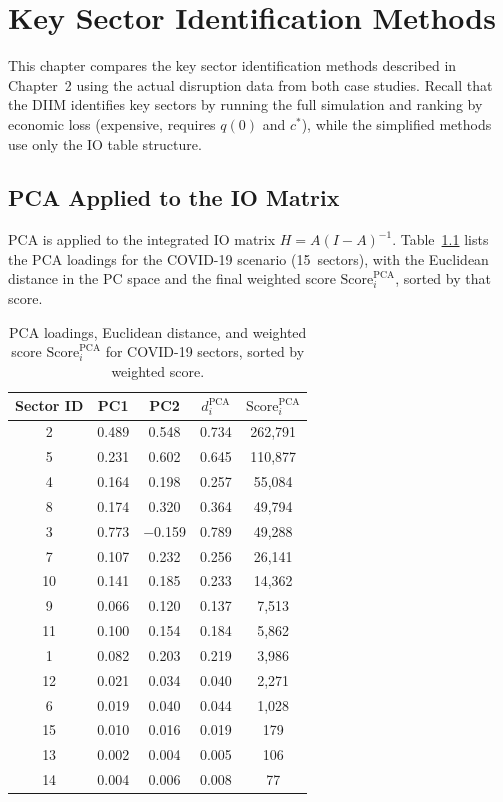 \chapter{Key Sector Identification Methods}

This chapter compares the key sector identification methods described in Chapter~2 using the actual disruption data from both case studies. Recall that the DIIM identifies key sectors by running the full simulation and ranking by economic loss (expensive, requires $q(0)$ and $c^{*}$), while the simplified methods use only the IO table structure.

\section{PCA Applied to the IO Matrix}

PCA is applied to the integrated IO matrix $H = A(I-A)^{-1}$. Table~\ref{tab:pca-loadings} lists the PCA loadings for the COVID-19 scenario (15~sectors), with the Euclidean distance in the PC space and the final weighted score $\text{Score}_i^{\text{PCA}}$, sorted by that score.

\begin{table}[H]
\centering
\begin{tabular}{@{}ccccc@{}}
\toprule
\textbf{Sector ID} & \textbf{PC1} & \textbf{PC2} & \textbf{$d_i^{\text{PCA}}$} & \textbf{$\text{Score}_i^{\text{PCA}}$} \\ \midrule
2  & 0.489 &    0.548 & 0.734 & 262,791 \\
5  & 0.231 &    0.602 & 0.645 & 110,877 \\
4  & 0.164 &    0.198 & 0.257 &  55,084 \\
8  & 0.174 &    0.320 & 0.364 &  49,794 \\
3  & 0.773 & $-$0.159 & 0.789 &  49,288 \\
7  & 0.107 &    0.232 & 0.256 &  26,141 \\
10 & 0.141 &    0.185 & 0.233 &  14,362 \\
9  & 0.066 &    0.120 & 0.137 &   7,513 \\
11 & 0.100 &    0.154 & 0.184 &   5,862 \\
1  & 0.082 &    0.203 & 0.219 &   3,986 \\
12 & 0.021 &    0.034 & 0.040 &   2,271 \\
6  & 0.019 &    0.040 & 0.044 &   1,028 \\
15 & 0.010 &    0.016 & 0.019 &     179 \\
13 & 0.002 &    0.004 & 0.005 &     106 \\
14 & 0.004 &    0.006 & 0.008 &      77 \\ \bottomrule
\end{tabular}
\caption{PCA loadings, Euclidean distance, and weighted score $\text{Score}_i^{\text{PCA}}$ for COVID-19 sectors, sorted by weighted score.}
\label{tab:pca-loadings}
\end{table}

